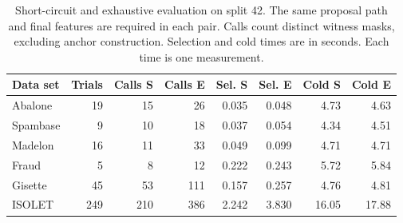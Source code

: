 \begin{table}[tb]
\centering
\caption{Short-circuit and exhaustive evaluation on split 42. The same proposal path and final features are required in each pair. Calls count distinct witness masks, excluding anchor construction. Selection and cold times are in seconds. Each time is one measurement.}
\label{tab:mechanism}
\small
\begin{tabular}{@{}lrrrrrrr@{}}
\toprule
Data set & Trials & Calls S & Calls E & Sel. S & Sel. E & Cold S & Cold E \\
\midrule
Abalone & 19 & 15 & 26 & 0.035 & 0.048 & 4.73 & 4.63 \\
Spambase & 9 & 10 & 18 & 0.037 & 0.054 & 4.34 & 4.51 \\
Madelon & 16 & 11 & 33 & 0.049 & 0.099 & 4.71 & 4.71 \\
Fraud & 5 & 8 & 12 & 0.222 & 0.243 & 5.72 & 5.84 \\
Gisette & 45 & 53 & 111 & 0.157 & 0.257 & 4.76 & 4.81 \\
ISOLET & 249 & 210 & 386 & 2.242 & 3.830 & 16.05 & 17.88 \\
\bottomrule
\end{tabular}
\end{table}

